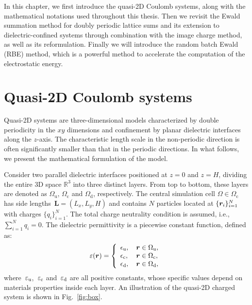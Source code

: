 In this chapter, we first introduce the quasi-2D Coulomb systems, along with the mathematical notations used throughout this thesis.
Then we revisit the Ewald summation method for doubly periodic lattice sums and its extension to dielectric-confined systems through combination with the image charge method, as well as its reformulation.
Finally we will introduce the random batch Ewald (RBE) method, which is a powerful method to accelerate the computation of the electrostatic energy.

\section{Quasi-2D Coulomb systems}

Quasi-2D systems are three-dimensional models characterized by double periodicity in the $xy$ dimensions and confinement by planar dielectric interfaces along the $z$-axis.
The characteristic length scale in the non-periodic direction is often significantly smaller than that in the periodic directions. 
In what follows, we present the mathematical formulation of the model.

Consider two parallel dielectric interfaces positioned at $z=0$ and $z=H$, dividing the entire 3D space $\mathbb{R}^3$ into three distinct layers. 
From top to bottom, these layers are denoted as $\Omega_{\text{u}}$, $\Omega_{\text{c}}$ and $\Omega_{\text{d}}$, respectively. 
The central simulation cell $\Omega\in\Omega_{\text{c}}$ has side lengths~$\bm{L}=(L_x, L_y, H)$ and contains $N$ particles located at $\{\boldsymbol{r}_i\}_{i=1}^{N}$ with charges $\{q_i\}_{i=1}^{N}$. 
The total charge neutrality condition is assumed, i.e., $\sum_{i=1}^{N}q_i=0$. The dielectric permittivity is a piecewise constant function, defined as:
\begin{equation}\label{eq:sanwich}
    \varepsilon(\boldsymbol{r})=\left\{
        \begin{array}{ll}
        \epsilon_{\mathrm{u}}, &\, {\boldsymbol{r} \in \Omega_{\mathrm{u}}},\\
        \epsilon_{\mathrm{c}}, &\, {\boldsymbol{r} \in \Omega_{\mathrm{c}}},\\
        \epsilon_{\mathrm{d}}, & \,{\boldsymbol{r} \in \Omega_{\mathrm{d}}},
    \end{array} \right.
\end{equation}
where~$\varepsilon_{\text{u}}$,~$\varepsilon_{\text{c}}$ and~$\varepsilon_{\text{d}}$ are all positive constants, whose specific values depend on materials properties inside each layer. 
An illustration of the quasi-2D charged system is shown in Fig.~\ref{fig:box}.

